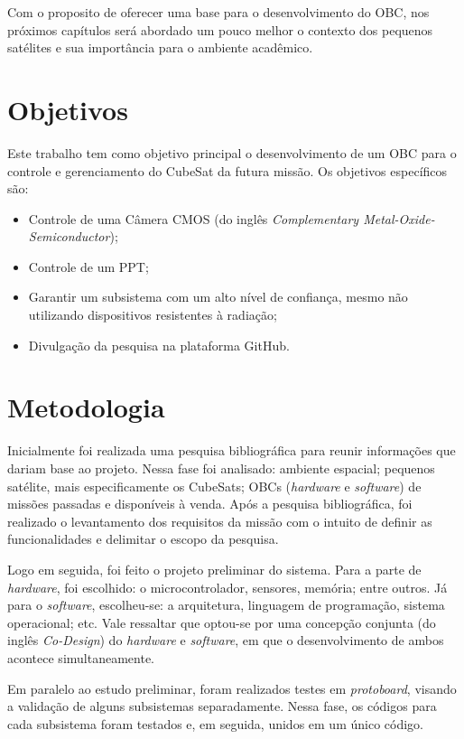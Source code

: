 Com o proposito de oferecer uma base para o desenvolvimento do OBC, nos próximos capítulos será abordado um pouco melhor o contexto dos pequenos satélites e sua importância para o ambiente acadêmico. 

\section{Objetivos}

Este trabalho tem como objetivo principal o desenvolvimento de um OBC para o controle e gerenciamento do CubeSat da futura missão.  Os objetivos específicos são:

\begin{itemize}
	
	\item Controle de uma Câmera CMOS (do inglês \textit{Complementary Metal-Oxide-Semiconductor});
	\item Controle de um PPT;
	\item Garantir um subsistema com um alto nível de confiança, mesmo não utilizando dispositivos resistentes à radiação;
	\item Divulgação da pesquisa na plataforma GitHub.
	
\end{itemize}


\section{Metodologia}
\label{metodo}
Inicialmente foi realizada uma pesquisa bibliográfica para reunir informações que dariam base ao projeto. Nessa fase foi analisado: ambiente espacial; pequenos satélite, mais especificamente os CubeSats; OBCs (\textit{hardware} e \textit{software}) de missões passadas e disponíveis à venda. Após a pesquisa bibliográfica, foi realizado o levantamento dos requisitos da missão com o intuito de definir as funcionalidades e delimitar o escopo da pesquisa.

Logo em seguida, foi feito o projeto preliminar do sistema. Para a parte de \textit{hardware}, foi escolhido: o microcontrolador, sensores, memória; entre outros. Já para o \textit{software}, escolheu-se: a arquitetura, linguagem de programação, sistema operacional; etc. Vale ressaltar que optou-se por uma concepção conjunta (do inglês \textit{Co-Design}) do \textit{hardware} e \textit{software}, em que o desenvolvimento de ambos acontece simultaneamente.

Em paralelo ao estudo preliminar, foram realizados testes em \textit{protoboard}, visando a validação de alguns subsistemas separadamente. Nessa fase, os códigos para cada subsistema foram testados e, em seguida, unidos em um único código.

